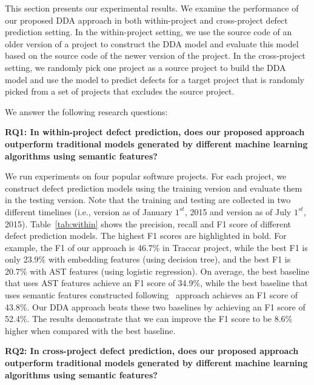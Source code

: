 This section presents our experimental results. We examine the performance of our proposed DDA approach in both within-project and cross-project defect prediction setting. In the within-project setting, we use the source code of an older version of a project to construct the DDA model and evaluate this model based on the source code of the newer version of the project. In the cross-project setting, we randomly pick one project as a source project to build the DDA model and use the model to predict defects for a target project that is randomly picked from a set of projects that excludes the source project.

We answer the following research questions: 

\textbf{RQ1: In within-project defect prediction, does our proposed approach outperform traditional models generated by different machine learning algorithms using semantic features?}

We run experiments on four popular software projects. For each project, we construct defect prediction models using the training version and evaluate them in the testing version. Note that the training and testing are collected in two different timelines (i.e., version as of January $1^{st}$, 2015 and version as of July $1^{st}$, 2015).
Table~\ref{tab:within} shows the precision, recall and F1 score of different defect prediction models. The highest F1 scores are highlighted in bold. For example, the F1 of our approach is 46.7\% in Traccar project, while the best F1 is only 23.9\% with embedding features (using decision tree), and the best F1 is 20.7\% with AST features (using logistic regression). On average, the best baseline that uses AST features achieve an F1 score of 34.9\%, while the best baseline that uses semantic features constructed following~\cite{wang2016automatically} approach achieves an F1 score of 43.8\%. Our DDA approach beats these two baselines by achieving an F1 score of 52.4\%. The results demonstrate that we can improve the F1 score to be 8.6\% higher when compared with the best baseline. 


\textbf{RQ2: In cross-project defect prediction, does our proposed approach outperform traditional models generated by different machine learning algorithms using semantic features?}

